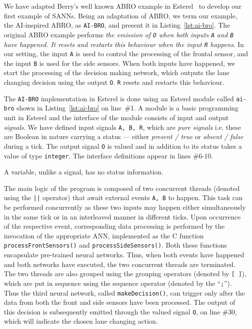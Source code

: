 We have adapted Berry's well known ABRO example in Esterel~\cite{berry2000foundations} to develop our first example of 
\acp{SANN}. Being an adaptation of ABRO, we term our example, the AI-inspired ABRO, as \texttt{AI-BRO}, and present it in Listing~\ref{lst:ai-bro}.
The original ABRO example performs \emph{the emission of \texttt{O} when both inputs \texttt{A} and \texttt{B} 
	have happened. It resets and restarts this behaviour when the input \texttt{R} happens}. In our setting, the input 
\texttt{A} is used to control the processing of the frontal sensor, and the input \texttt{B} is used for the side sensors.
When both inputs have happened, we start the processing of the decision making network, which outputs the 
lane changing decision using the output \texttt{O}. \texttt{R} resets and restarts this behaviour.

The \texttt{AI-BRO} implementation in Esterel is done using an Esterel module called \texttt{ai-bro} shown in Listing~\ref{lst:ai-bro} on line~\#1.
A module is a basic programming unit in Esterel and the interface of the module consists of input and
output \emph{signals}. We have defined input signals \texttt{A, B, R}, which are \emph{pure signals}
i.e. these are Boolean in nature carrying a status --- either \emph{present / true} or \emph{absent / false} during a tick. The output signal 
\texttt{O} is valued and in addition to its status takes a value of type \texttt{integer}. The interface definitions appear in 
lines \#6-10. %
A variable, unlike a signal, has no status information. 

The main logic of the program is composed of two concurrent threads (denoted using the \texttt{||} operator)
that await external events \texttt{A, B} to happen. 
This task can be performed concurrently as these two inputs may happen either simultaneously in the same tick or 
in an interleaved manner in different ticks. Upon occurrence of the respective event, corresponding data processing 
is performed by the invocation of the appropriate \ac{ANN}, implemented as the C function \texttt{processFrontSensors()}
and \texttt{processSideSensors()}. Both these functions encapsulate pre-trained neural networks. Thus, when both events have 
happened and both networks have executed, the two concurrent threads are terminated. The two threads are also grouped using the 
grouping operators (denoted by \texttt{[ ]}), which are put in sequence using the sequence operator (denoted by the ``\texttt;''). %
Thus the third neural network, called \texttt{makeDecision()},
can trigger only after the data from both the front and side sensors have been processed. 
The output of this decision is subsequently emitted through the valued signal \texttt{O}, on line \#30, which will indicate the chosen lane changing action.

